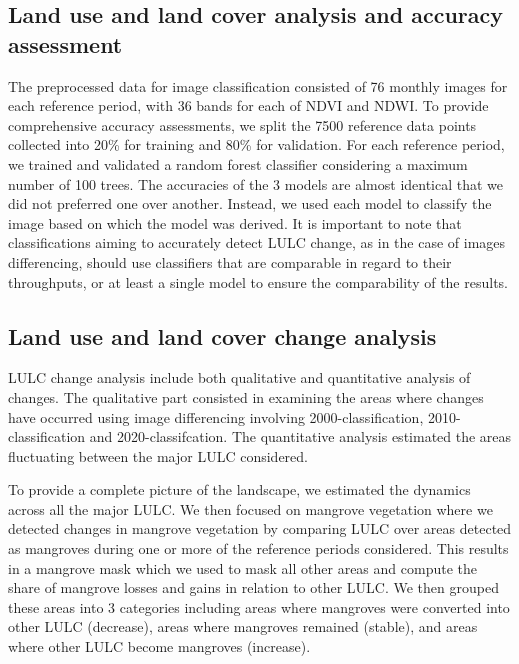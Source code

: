 \documentclass[utf8]{frontiersSCNS}
\begin{document}
\hypertarget{ref32}{%
\subsection{Land use and land cover analysis and accuracy
assessment}\label{ref32}}

The preprocessed data for image classification consisted of 76 monthly
images for each reference period, with 36 bands for each of NDVI and
NDWI. To provide comprehensive accuracy assessments, we split the 7500
reference data points collected into 20\% for training and 80\% for
validation. For each reference period, we trained and validated a random
forest classifier considering a maximum number of 100 trees. The
accuracies of the 3 models are almost identical that we did not
preferred one over another. Instead, we used each model to classify the
image based on which the model was derived. It is important to note that
classifications aiming to accurately detect LULC change, as in the case
of images differencing, should use classifiers that are comparable in
regard to their throughputs, or at least a single model to ensure the
comparability of the results.

\hypertarget{ref33}{%
\subsection{Land use and land cover change analysis}\label{ref33}}

LULC change analysis include both qualitative and quantitative analysis
of changes. The qualitative part consisted in examining the areas where
changes have occurred using image differencing involving
2000-classification, 2010-classification and 2020-classifcation. The
quantitative analysis estimated the areas fluctuating between the major
LULC considered.

To provide a complete picture of the landscape, we estimated the
dynamics across all the major LULC. We then focused on mangrove
vegetation where we detected changes in mangrove vegetation by comparing
LULC over areas detected as mangroves during one or more of the
reference periods considered. This results in a mangrove mask which we
used to mask all other areas and compute the share of mangrove losses
and gains in relation to other LULC. We then grouped these areas into 3
categories including areas where mangroves were converted into other
LULC (decrease), areas where mangroves remained (stable), and areas
where other LULC become mangroves (increase).
\end{document}
